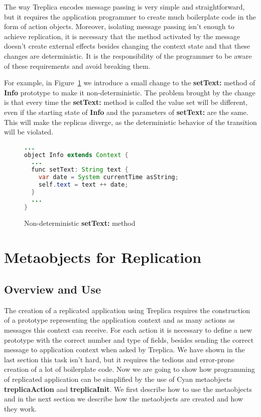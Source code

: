 \documentclass[preprint,review]{elsarticle}
\newcommand{\srcstyle}[1]{\ttfamily\textbf{#1}\rmfamily}
\begin{document}
The  way  Treplica   encodes  message  passing  is   very  simple  and
straightforward, but it requires  the application programmer to create
much  boilerplate  code in  the  form  of action  objects.   Moreover,
isolating message passing  isn't enough to achieve  replication, it is
necessary  that the  method activated  by the  message doesn't  create
external effects  besides changing  the context  state and  that these
changes are deterministic. It is  the responsibility of the programmer
to be aware of these requirements and avoid breaking them.

For example,  in Figure~\ref{cod:PropostaConsistencia} we  introduce a
small  change to  the  \srcstyle{setText:}  method of  \srcstyle{Info}
prototype to  make it non-deterministic.   The problem brought  by the
change is that every time the \srcstyle{setText:} method is called the
value  set  will   be  different,  even  if  the   starting  state  of
\srcstyle{Info}  and the  parameters  of  \srcstyle{setText:} are  the
same.   This will  make  the replicas  diverge,  as the  deterministic
behavior of the transition will be violated.

\begin{figure}[h]
\centering
\begin{lstlisting}[language=Java]
...
object Info extends Context {
  ...
  func setText: String text {
    var date = System currentTime asString;
    self.text = text ++ date;
  }
  ...
}
\end{lstlisting}
\caption{Non-deterministic \srcstyle{setText:} method}
\label{cod:PropostaConsistencia}
\end{figure}


\section{Metaobjects for Replication}
\label{metaobjects}

\subsection{Overview and Use}

The creation of  a replicated application using  Treplica requires the
construction of  a prototype representing the  application context and
as many actions as messages this  context can receive. For each action
it is necessary to define a  new prototype with the correct number and
type of  fields, besides  sending the  correct message  to application
context when asked by Treplica. We have shown in the last section this
task isn't hard, but it  requires the tedious and error-prone creation
of a lot of boilerplate code. Now we are going to show how programming
of  replicated  application can  be  simplified  by  the use  of  Cyan
metaobjects \srcstyle{treplicaAction}  and \srcstyle{treplicaInit}. We
first describe how  to use the metaobjects and in  the next section we
describe how the metaobjects are created and how they work.
\end{document}
